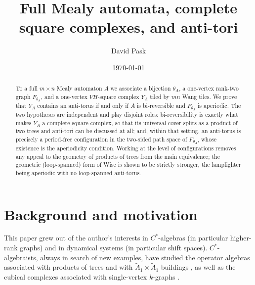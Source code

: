 \documentclass[11pt,reqno]{amsart}
\theoremstyle{plain}
\theoremstyle{definition}
\begin{document}
\title[Anti-tori from full Mealy automata]
{Full Mealy automata, complete square complexes, and anti-tori}

\author{David Pask}
\date{\today}
\address{Math Department, James Cook University, 1 James Cook Dr, Douglas QLD 4814, Australia}

\begin{abstract}
To a full $m\times n$ Mealy automaton $A$ we associate a bijection $\theta_A$, a
one-vertex rank-two graph $F_{\theta_A}$, and a one-vertex $VH$-square complex
$Y_A$ tiled by $mn$ Wang tiles. We prove that $Y_A$ contains an anti-torus if and
only if $A$ is bi-reversible and $F_{\theta_A}$ is aperiodic. The two hypotheses
are independent and play disjoint roles: bi-reversibility is exactly what makes
$Y_A$ a complete square complex, so that its universal cover splits as a product
of two trees and anti-tori can be discussed at all; and, within that setting, an
anti-torus is precisely a period-free configuration in the two-sided path space of
$F_{\theta_A}$, whose existence is the aperiodicity condition. Working at the level
of configurations removes any appeal to the geometry of products of trees from the
main equivalence; the geometric (loop-spanned) form of Wise is shown to be strictly
stronger, the lamplighter being aperiodic with no loop-spanned anti-torus.
\end{abstract}


\maketitle

\section{Background and motivation}

This paper grew out of the author's interests in $C^*$-algebras (in particular
higher-rank graphs) and in dynamical systems (in particular shift spaces).
$C^*$-algebraists, always in search of new examples, have studied the operator
algebras associated with products of trees and with $\tilde{A}_1\times\tilde{A}_1$
buildings \cite{RRS,KR}, as well as the cubical complexes associated with
single-vertex $k$-graphs \cite{LV,MRV}.
\end{document}
